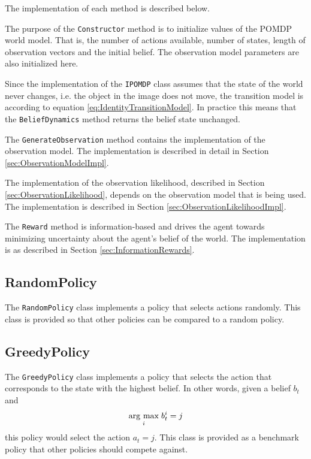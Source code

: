 The implementation of each method is described below.

\begin{description} [style=nextline]
  \item[\texttt{Constructor}]
  The purpose of the \texttt{Constructor} method is to initialize values of the POMDP world model. That is, the number of actions available, number of states, length of observation vectors and the initial belief. The observation model parameters are also initialized here.

  \item[\texttt{BeliefDynamics}]
  Since the implementation of the \texttt{IPOMDP} class assumes that the state of the world never changes, i.e. the object in the image does not move, the transition model is according to equation \eqref{eq:IdentityTransitionModel}. In practice this means that the \texttt{BeliefDynamics} method returns the belief state unchanged.

  \item[\texttt{GenerateObservation}]
  The \texttt{GenerateObservation} method contains the implementation of the observation model. The implementation is described in detail in Section \ref{sec:ObservationModelImpl}.

  \item[\texttt{ObservationLikelihood}]
  The implementation of the observation likelihood, described in Section \ref{sec:ObservationLikelihood}, depends on the observation model that is being used. The implementation is described in Section \ref{sec:ObservationLikelihoodImpl}.

  \item[\texttt{Reward}]
  The \texttt{Reward} method is information-based and drives the agent towards minimizing uncertainty about the agent's belief of the world. The implementation is as described in Section \ref{sec:InformationRewards}.
\end{description}

\subsection{RandomPolicy}
\label{sec:RandomPolicy}
The \texttt{RandomPolicy} class implements a policy that selects actions randomly. This class is provided so that other policies can be compared to a random policy.

\subsection{GreedyPolicy}
\label{sec:GreedyPolicy}
The \texttt{GreedyPolicy} class implements a policy that selects the action that corresponds to the state with the highest belief. In other words, given a belief $b_t$ and 
\begin{equation}
  \underset{i}{\operatorname{arg}\,\operatorname{max}}\; b_t^i = j
\end{equation}
this policy would select the action $a_t = j$. This class is provided as a benchmark policy that other policies should compete against.


